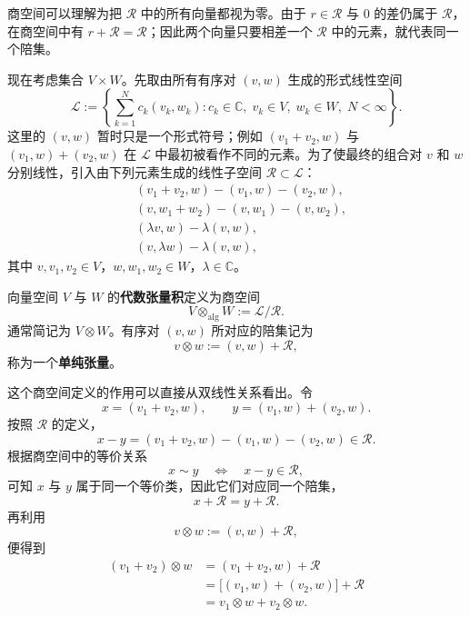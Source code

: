 \documentclass[UTF8,a4paper,11pt,openany]{ctexbook}
\begin{document}
商空间可以理解为把 $\mathcal R$ 中的所有向量都视为零。由于
$r\in\mathcal R$ 与 $0$ 的差仍属于 $\mathcal R$，在商空间中有
$r+\mathcal R=\mathcal R$；因此两个向量只要相差一个 $\mathcal R$ 中的元素，就代表同一个陪集。

现在考虑集合 $V\times W$。先取由所有有序对 $(v,w)$ 生成的形式线性空间
\begin{equation}
    \mathcal L
    :=
    \left\{
        \sum_{k=1}^{N}
        c_k(v_k,w_k):
        c_k\in\mathbb C,\;
        v_k\in V,\;
        w_k\in W,\;
        N<\infty
    \right\}.
\end{equation}
这里的 $(v,w)$ 暂时只是一个形式符号；例如 $(v_1+v_2,w)$ 与
$(v_1,w)+(v_2,w)$ 在 $\mathcal L$ 中最初被看作不同的元素。为了使最终的组合对 $v$ 和 $w$ 分别线性，引入由下列元素生成的线性子空间 $\mathcal R\subset\mathcal L$：
\begin{align}
    &(v_1+v_2,w)-(v_1,w)-(v_2,w),\nonumber\\
    &(v,w_1+w_2)-(v,w_1)-(v,w_2),\nonumber\\
    &(\lambda v,w)-\lambda(v,w),\nonumber\\
    &(v,\lambda w)-\lambda(v,w),
\end{align}
其中 $v,v_1,v_2\in V$，$w,w_1,w_2\in W$，$\lambda\in\mathbb C$。

\begin{definition}[代数张量积]
向量空间 $V$ 与 $W$ 的\textbf{代数张量积}定义为商空间
\begin{equation}
    V\otimes_{\mathrm{alg}}W
    :=
    \mathcal L/\mathcal R.
\end{equation}
通常简记为 $V\otimes W$。有序对 $(v,w)$ 所对应的陪集记为
\begin{equation}
    v\otimes w
    :=
    (v,w)+\mathcal R,
\end{equation}
称为一个\textbf{单纯张量}。
\end{definition}

这个商空间定义的作用可以直接从双线性关系看出。令
\[
x=(v_1+v_2,w),
\qquad
y=(v_1,w)+(v_2,w).
\]
按照 $\mathcal R$ 的定义，
\[
x-y
=
(v_1+v_2,w)-(v_1,w)-(v_2,w)
\in\mathcal R.
\]
根据商空间中的等价关系
\[
x\sim y
\quad\Longleftrightarrow\quad
x-y\in\mathcal R,
\]
可知 $x$ 与 $y$ 属于同一个等价类，因此它们对应同一个陪集，
\[
x+\mathcal R
=
y+\mathcal R.
\]
再利用
\[
v\otimes w:=(v,w)+\mathcal R,
\]
便得到
\begin{align}
    (v_1+v_2)\otimes w
    &=
    (v_1+v_2,w)+\mathcal R
    \nonumber\\
    &=
    \bigl[(v_1,w)+(v_2,w)\bigr]+\mathcal R
    \nonumber\\
    &=
    v_1\otimes w+v_2\otimes w.
\end{align}
\end{document}
